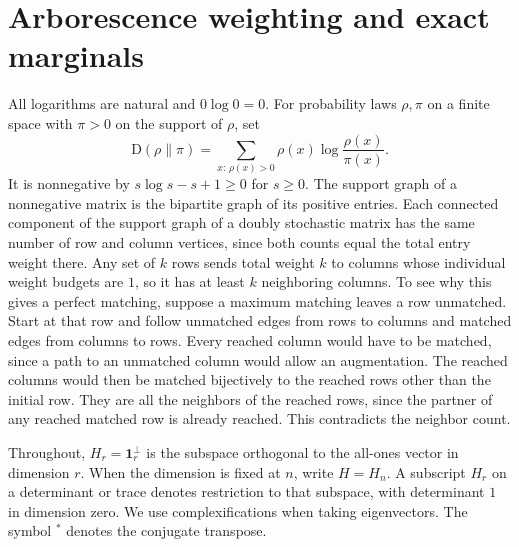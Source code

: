 \documentclass[11pt]{article}
\newcommand{\one}{\mathbf{1}}
\newcommand{\KL}{\mathrm{D}}
\begin{document}
\section{Arborescence weighting and exact marginals}\label{sec:trees}

All logarithms are natural and \(0\log 0=0\). For probability laws \(\rho,\pi\) on a finite space with \(\pi>0\) on the support of \(\rho\), set
\[
 \KL(\rho\|\pi)=\sum_{x:\,\rho(x)>0}\rho(x)\log\frac{\rho(x)}{\pi(x)}.
\]
It is nonnegative by \(s\log s-s+1\ge 0\) for \(s\ge 0\). The support graph of a nonnegative matrix is the bipartite graph of its positive entries. Each connected component of the support graph of a doubly stochastic matrix has the same number of row and column vertices, since both counts equal the total entry weight there. Any set of \(k\) rows sends total weight \(k\) to columns whose individual weight budgets are \(1\), so it has at least \(k\) neighboring columns. To see why this gives a perfect matching, suppose a maximum matching leaves a row unmatched. Start at that row and follow unmatched edges from rows to columns and matched edges from columns to rows. Every reached column would have to be matched, since a path to an unmatched column would allow an augmentation. The reached columns would then be matched bijectively to the reached rows other than the initial row. They are all the neighbors of the reached rows, since the partner of any reached matched row is already reached. This contradicts the neighbor count.

Throughout, \(H_r=\one_r^\perp\) is the subspace orthogonal to the all-ones vector in dimension \(r\). When the dimension is fixed at \(n\), write \(H=H_n\). A subscript \(H_r\) on a determinant or trace denotes restriction to that subspace, with determinant \(1\) in dimension zero. We use complexifications when taking eigenvectors. The symbol \({}^*\) denotes the conjugate transpose.
\end{document}
